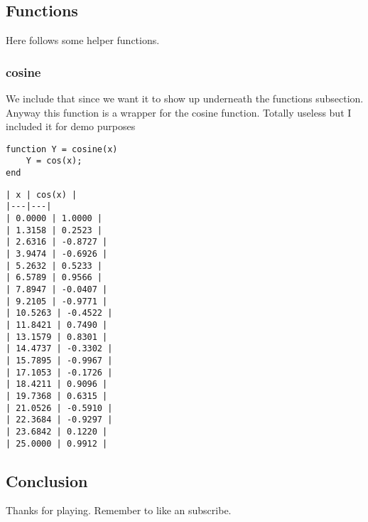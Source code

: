 \documentclass{article}
\begin{document}
\subsection*{Functions}

\begin{par}
Here follows some helper functions.
\end{par} \vspace{1em}
\begin{par}

\subsubsection*{cosine}

\end{par} \vspace{1em}
\begin{par}
We include that since we want it to show up underneath the functions subsection. Anyway this function is a wrapper for the cosine function. Totally useless but I included it for demo purposes
\end{par} \vspace{1em}
\begin{verbatim}
function Y = cosine(x)
    Y = cos(x);
end
\end{verbatim}

        \color{lightgray} \begin{verbatim}| x | cos(x) |
|---|---|
| 0.0000 | 1.0000 |
| 1.3158 | 0.2523 |
| 2.6316 | -0.8727 |
| 3.9474 | -0.6926 |
| 5.2632 | 0.5233 |
| 6.5789 | 0.9566 |
| 7.8947 | -0.0407 |
| 9.2105 | -0.9771 |
| 10.5263 | -0.4522 |
| 11.8421 | 0.7490 |
| 13.1579 | 0.8301 |
| 14.4737 | -0.3302 |
| 15.7895 | -0.9967 |
| 17.1053 | -0.1726 |
| 18.4211 | 0.9096 |
| 19.7368 | 0.6315 |
| 21.0526 | -0.5910 |
| 22.3684 | -0.9297 |
| 23.6842 | 0.1220 |
| 25.0000 | 0.9912 |
\end{verbatim} \color{black}
    

\subsection*{Conclusion}

\begin{par}
Thanks for playing. Remember to like an subscribe.
\end{par} \vspace{1em}
\end{document}
